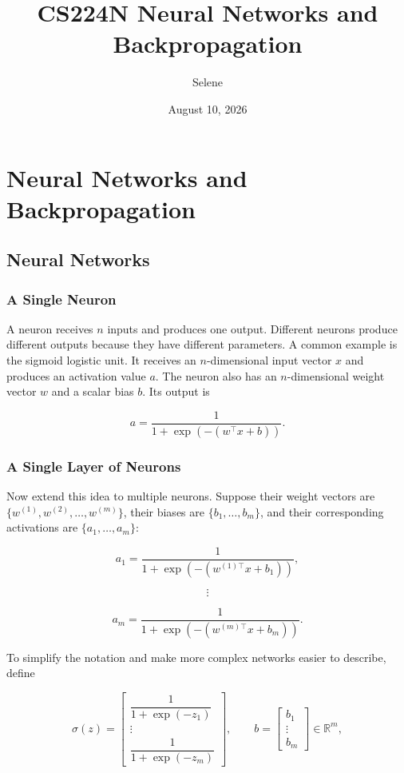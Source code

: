 \documentclass[
  a4paper,
  10pt]{article}
\title{CS224N \textbar{} Neural Networks and Backpropagation}
\author{Selene}
\date{August 10, 2026}
\begin{document}
\maketitle

\section{Neural Networks and
Backpropagation}\label{neural-networks-and-backpropagation}

\subsection{Neural Networks}\label{neural-networks}

\subsubsection{A Single Neuron}\label{a-single-neuron}

A neuron receives \(n\) inputs and produces one output. Different
neurons produce different outputs because they have different
parameters. A common example is the sigmoid logistic unit. It receives
an \(n\)-dimensional input vector \(x\) and produces an activation value
\(a\). The neuron also has an \(n\)-dimensional weight vector \(w\) and
a scalar bias \(b\). Its output is

\[
a=\frac{1}{1+\exp\left(-\left(w^\top x+b\right)\right)}.
\]

\subsubsection{A Single Layer of
Neurons}\label{a-single-layer-of-neurons}

Now extend this idea to multiple neurons. Suppose their weight vectors
are \(\{w^{(1)},w^{(2)},\dots,w^{(m)}\}\), their biases are
\(\{b_1,\dots,b_m\}\), and their corresponding activations are
\(\{a_1,\dots,a_m\}\):

\[
a_1=\frac{1}{1+\exp\left(-\left(w^{(1)\top}x+b_1\right)\right)},
\]

\[
\vdots
\]

\[
a_m=\frac{1}{1+\exp\left(-\left(w^{(m)\top}x+b_m\right)\right)}.
\]

To simplify the notation and make more complex networks easier to
describe, define

\[
\sigma(z)=
\begin{bmatrix}
\dfrac{1}{1+\exp(-z_1)}\\
\vdots\\
\dfrac{1}{1+\exp(-z_m)}
\end{bmatrix},
\qquad
b=
\begin{bmatrix}
b_1\\
\vdots\\
b_m
\end{bmatrix}
\in\mathbb{R}^m,
\]
\end{document}
